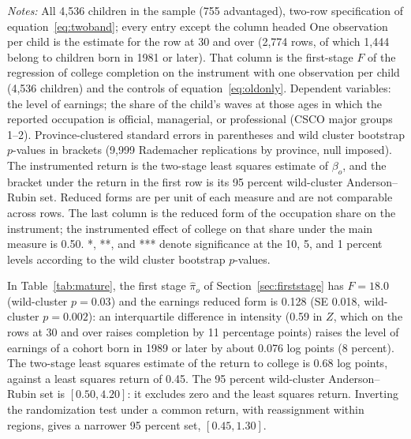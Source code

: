 \documentclass[11pt]{article}
\begin{document}
\begin{table}[t]
\centering
\small
\caption{Earnings and occupation: first stages, reduced forms, and instrumented returns across measures of provincial intensity.}
\label{tab:mature}

\par\smallskip
\begin{minipage}{0.92\textwidth}
\footnotesize\emph{Notes:} All 4,536 children in the sample (755 advantaged), two-row specification of equation~\eqref{eq:twoband}; every entry except the column headed One observation per child is the estimate for the row at 30 and over (2,774 rows, of which 1,444 belong to children born in 1981
or later). That column is the first-stage $F$ of the regression of college completion on the instrument with one observation per child (4,536 children) and the controls of equation~\eqref{eq:oldonly}. Dependent variables: the level of earnings; the share of the child's waves at those ages in which the reported occupation is official, managerial, or professional (CSCO major groups 1--2). Province-clustered standard errors in parentheses and
wild cluster bootstrap $p$-values in brackets (9,999 Rademacher
replications by province, null imposed). The instrumented return is the two-stage least squares estimate of $\beta_o$, and the bracket under the return in the first row is its 95 percent wild-cluster Anderson--Rubin set. Reduced forms are per unit of each measure and are not comparable across rows. The last column is the reduced form of the occupation share on the instrument; the instrumented effect of college on that share under the main measure is 0.50.
*, **, and *** denote significance at the 10, 5, and 1 percent levels according to the wild cluster bootstrap $p$-values.
\end{minipage}
\end{table}

In Table~\ref{tab:mature}, the first stage $\hat\pi_o$ of Section~\ref{sec:firststage} has $F = 18.0$ (wild-cluster $p = 0.03$) and the earnings reduced form is 0.128 (SE
0.018, wild-cluster $p = 0.002$): an interquartile difference in intensity (0.59 in $Z$, which on the rows at 30 and over raises completion by 11 percentage points) raises the level of earnings of a cohort born in 1989 or later by about 0.076 log points (8 percent). The two-stage least squares estimate of the return to college is 0.68 log points, against a least squares return of 0.45. The 95 percent wild-cluster Anderson--Rubin set is $[0.50, 4.20]$: it excludes zero and the least squares return. Inverting the randomization test under a common return, with reassignment within regions, gives a narrower 95 percent set, $[0.45, 1.30]$.
\end{document}
